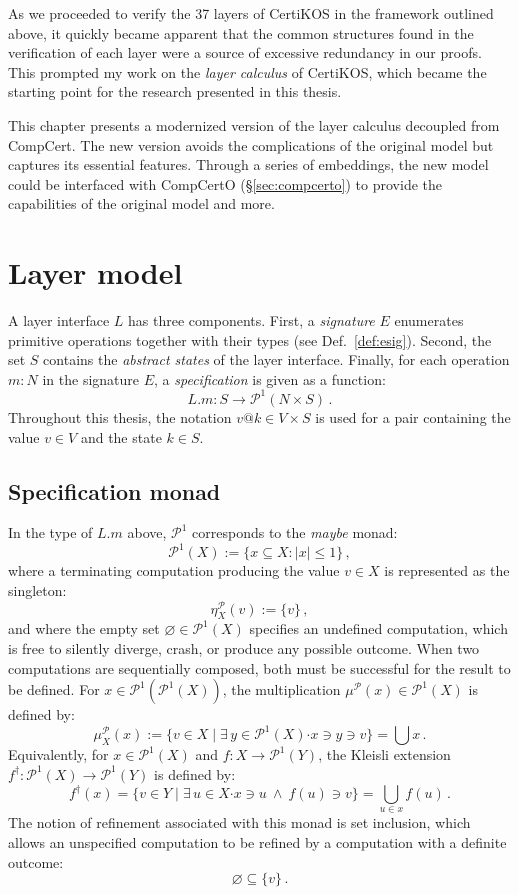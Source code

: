 \documentclass[11pt,oneside]{book}
\theoremstyle{definition}
\newcommand{\bdot}{\boldsymbol{\cdot}}
\begin{document}
As we proceeded to verify the 37 layers of CertiKOS
in the framework outlined above,
it quickly became apparent that
the common structures found in the verification of each layer
were a source of excessive redundancy in our proofs.
This prompted my work on the \emph{layer calculus} of CertiKOS,
which became the starting point for the research
presented in this thesis.

This chapter
presents a modernized version of the layer calculus
decoupled from CompCert.
The new version avoids the complications of the original model
but captures its essential features.
Through a series of embeddings,
the new model could be interfaced with
CompCertO (\S\ref{sec:compcerto})
to provide the capabilities of the original model
and more.



\section{Layer model} %

A layer interface $L$ has three components.
First, a \emph{signature} $E$ enumerates
primitive operations together with their types
(see Def.~\ref{def:esig}).
Second,
the set $S$ contains the \emph{abstract states} of the layer interface.
Finally, for each operation $m \mathbin: N$ in the signature $E$,
a \emph{specification}
is given as a function:
\[
  L.m : S \rightarrow \mathcal{P}^1( N \times S) \,.
\]
Throughout this thesis,
the notation $v@k \in V \times S$ is used for a pair
containing the value $v \in V$ and the state $k \in S$.

\subsection{Specification monad} %

In the type of $L.m$ above,
$\mathcal{P}^1$ corresponds to the \emph{maybe} monad:
\[
  \mathcal{P}^1(X) := \{ x \subseteq X : |x| \le 1 \} \,,
\]
where a terminating computation producing
the value $v \in X$ is represented as the singleton:
\[
  \eta^\mathcal{P}_X(v) := \{ v \} \,,
\]
and where the empty set $\varnothing \in \mathcal{P}^1(X)$
specifies an undefined computation,
which is free to silently diverge, crash, or
produce any possible outcome.
When two computations are sequentially composed,
both must be successful for the result to be defined.
For $x \in \mathcal{P}^1(\mathcal{P}^1(X))$,
the multiplication $\mu^\mathcal{P}(x) \in \mathcal{P}^1(X)$
is defined by:
\[
  \mu^\mathcal{P}_X(x) :=
    \{ v \in X \mid
       \exists \, y \in \mathcal{P}^1(X) \bdot x \ni y \ni v \} =
    \bigcup x
  \,.
\]
Equivalently,
for $x \in \mathcal{P}^1(X)$ and $f : X \rightarrow \mathcal{P}^1(Y)$,
the Kleisli extension
$f^\dagger : \mathcal{P}^1(X) \rightarrow \mathcal{P}^1(Y)$
is defined by:
\[
  f^\dagger(x)
    = \{ v \in Y \mid \exists \, u \in X \bdot x \ni u \:\wedge\: f(u) \ni v \}
    = \bigcup_{u \in x} f(u)
  \,.
\]
The notion of refinement associated with this monad is set inclusion,
which allows an unspecified computation to be refined by
a computation with a definite outcome:
\[
  \varnothing \subseteq \{ v \} \,.
\]
\end{document}
